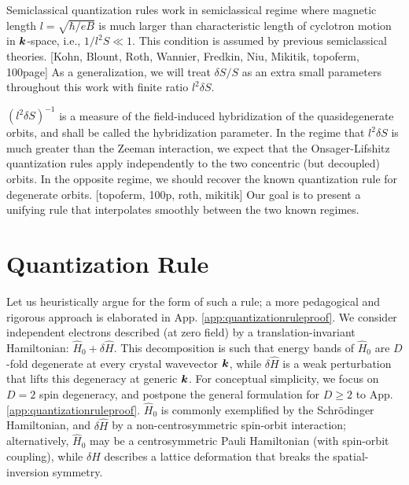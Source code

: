 \documentclass[aps, prb, showpacs, twocolumn, notitlepage, superscriptaddress]{revtex4-1}
\begin{document}
Semiclassical quantization rules work in semiclassical regime where magnetic length $l=\sqrt{\hbar/eB}$ is much larger than characteristic length of cyclotron motion in $\boldsymbol{k}$-space, i.e., $1/l^2 S\ll 1$. This condition is assumed by previous semiclassical theories. [Kohn, Blount, Roth, Wannier, Fredkin, Niu, Mikitik, topoferm, 100page] As a generalization, we will treat $\delta S/S$ as an extra small parameters throughout this work with finite ratio $l^2\delta S$. 

$(l^2\delta S)^{-1}$ is a measure of the field-induced hybridization of the quasidegenerate orbits, and shall be called the hybridization parameter. 
In the regime that $l^2\delta S$ is much greater than the Zeeman interaction, we expect that the Onsager-Lifshitz quantization rules apply independently to the two concentric (but decoupled) orbits. In the opposite regime, we should recover the known quantization rule for degenerate orbits. [topoferm, 100p, roth, mikitik] Our goal is to present a unifying rule that interpolates smoothly between the two known regimes.

\section{Quantization Rule\label{sec:qtznrules}}

Let us heuristically argue for the form of such a rule; a more pedagogical and rigorous approach is elaborated in App. \ref{app:quantizationruleproof}. We consider independent electrons described (at zero field) by a translation-invariant Hamiltonian: $\hat{H}_0{+}\delta \hat{H}$. This decomposition is such that energy bands of $\hat{H}_0$ are $D$-fold degenerate at every crystal wavevector $\boldsymbol{k}$, while $\delta \hat{H}$ is a weak perturbation that lifts this degeneracy at generic $\boldsymbol{k}$. For conceptual simplicity, we focus on $D{=}2$ spin degeneracy, and postpone the general formulation for $D{\geq}2$ to App. \ref{app:quantizationruleproof}.  $\hat{H}_0$ is commonly exemplified by  the Schr\"odinger Hamiltonian, and $\delta \hat{H}$ by a non-centrosymmetric spin-orbit interaction; alternatively, $\hat{H}_0$ may be a centrosymmetric Pauli Hamiltonian (with spin-orbit coupling), while $\delta H$ describes a lattice deformation that breaks the spatial-inversion symmetry.  

\end{document}
